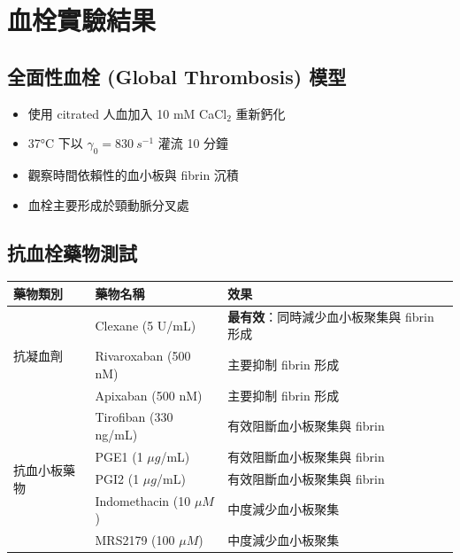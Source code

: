 \documentclass[12pt,a4paper]{article}
\begin{document}
\section{血栓實驗結果}

\subsection{全面性血栓 (Global Thrombosis) 模型}

\begin{itemize}
    \item 使用 citrated 人血加入 10 mM CaCl$_2$ 重新鈣化
    \item 37°C 下以 $\gamma_0 = 830\ s^{-1}$ 灌流 10 分鐘
    \item 觀察時間依賴性的血小板與 fibrin 沉積
    \item 血栓主要形成於頸動脈分叉處
\end{itemize}


\subsection{抗血栓藥物測試}

\begin{longtable}{p{3cm}p{3.5cm}p{7.5cm}}
\toprule
\textbf{藥物類別} & \textbf{藥物名稱} & \textbf{效果} \\
\midrule
\endhead
\multirow{3}{*}{抗凝血劑} & Clexane (5 U/mL) & \textbf{最有效}：同時減少血小板聚集與 fibrin 形成 \\
& Rivaroxaban (500 nM) & 主要抑制 fibrin 形成 \\
& Apixaban (500 nM) & 主要抑制 fibrin 形成 \\
\midrule
\multirow{5}{*}{抗血小板藥物} & Tirofiban (330 ng/mL) & 有效阻斷血小板聚集與 fibrin \\
& PGE1 (1 $\mu g$/mL) & 有效阻斷血小板聚集與 fibrin \\
& PGI2 (1 $\mu g$/mL) & 有效阻斷血小板聚集與 fibrin \\
& Indomethacin (10 $\mu M$) & 中度減少血小板聚集 \\
& MRS2179 (100 $\mu M$) & 中度減少血小板聚集 \\
\bottomrule
\end{longtable}
\end{document}
